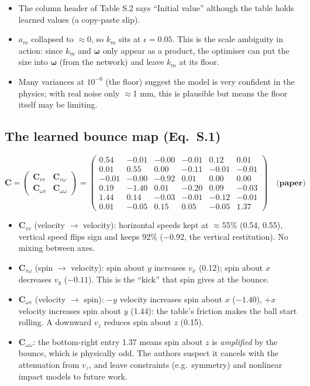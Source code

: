 \documentclass[11pt,a4paper]{article}
\newcommand{\ww}{\boldsymbol{\omega}}
\begin{document}
\begin{warn}
\begin{itemize}
\item The column header of Table S.2 says ``Initial value'' although the table holds learned values (a copy-paste slip).
\item $a_m$ collapsed to $\approx0$, so $k_m$ sits at $\epsilon=0.05$. This is the scale ambiguity in action: since $k_m$ and $\ww$ only appear as a product, the optimiser can put the size into $\ww$ (from the network) and leave $k_m$ at its floor.
\item Many variances at $10^{-6}$ (the floor) suggest the model is very confident in the physics; with real noise only $\approx$1 mm, this is plausible but means the floor itself may be limiting.
\end{itemize}
\end{warn}

\subsection{The learned bounce map (Eq.~S.1)}
\[
\mathbf C=\begin{pmatrix}\mathbf C_{vv}&\mathbf C_{v\omega}\\ \mathbf C_{\omega v}&\mathbf C_{\omega\omega}\end{pmatrix}=
\left(\begin{array}{rrr|rrr}
0.54&-0.01&-0.00&-0.01&0.12&0.01\\
0.01&0.55&0.00&-0.11&-0.01&-0.01\\
-0.01&-0.00&-0.92&0.01&0.00&0.00\\ \hline
0.19&-1.40&0.01&-0.20&0.09&-0.03\\
1.44&0.14&-0.03&-0.01&-0.12&-0.01\\
0.01&-0.05&0.15&0.05&-0.05&1.37
\end{array}\right)\quad\textbf{(paper)}
\]
\begin{itemize}
\item $\mathbf C_{vv}$ (velocity $\to$ velocity): horizontal speeds kept at $\approx$55\% (0.54, 0.55), vertical speed flips sign and keeps 92\% ($-0.92$, the vertical restitution). No mixing between axes.
\item $\mathbf C_{v\omega}$ (spin $\to$ velocity): spin about $y$ increases $v_x$ (0.12); spin about $x$ decreases $v_y$ ($-0.11$). This is the ``kick'' that spin gives at the bounce.
\item $\mathbf C_{\omega v}$ (velocity $\to$ spin): $-y$ velocity increases spin about $x$ ($-1.40$), $+x$ velocity increases spin about $y$ (1.44): the table's friction makes the ball start rolling. A downward $v_z$ reduces spin about $z$ (0.15).
\item $\mathbf C_{\omega\omega}$: the bottom-right entry 1.37 means spin about $z$ is \emph{amplified} by the bounce, which is physically odd. The authors suspect it cancels with the attenuation from $v_z$, and leave constraints (e.g.\ symmetry) and nonlinear impact models to future work.
\end{itemize}
\end{document}
